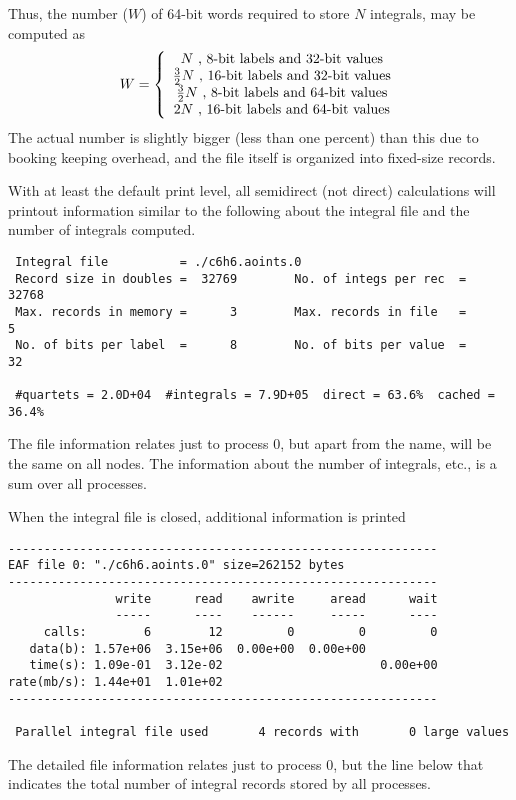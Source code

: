 Thus, the number ($W$) of 64-bit words required to store $N$ integrals,
may be computed as
\begin{displaymath}
  W = \left\{ \\
      \begin{array}{c}
        N \mbox{ , 8-bit labels and 32-bit values} \\
        \frac{3}{2}N \mbox{ , 16-bit labels and 32-bit values} \\
        \frac{3}{2}N \mbox{ , 8-bit labels and 64-bit values} \\
        2N \mbox{ , 16-bit labels and 64-bit values} 
      \end{array}
      \right.
\end{displaymath}
The actual number is slightly bigger (less than one percent) than this
due to booking keeping overhead, and the file itself is organized into
fixed-size records.

With at least the default print level, all semidirect (not direct)
calculations will printout information similar to the following about
the integral file and the number of integrals computed.
\begin{verbatim}
 Integral file          = ./c6h6.aoints.0
 Record size in doubles =  32769        No. of integs per rec  =  32768
 Max. records in memory =      3        Max. records in file   =      5
 No. of bits per label  =      8        No. of bits per value  =     32

 #quartets = 2.0D+04  #integrals = 7.9D+05  direct = 63.6%  cached = 36.4%
\end{verbatim}
The file information relates just to process 0, but apart from the
name, will be the same on all nodes.  The information about the number
of integrals, etc., is a sum over all processes.

When the integral file is closed, additional information is printed
\begin{verbatim}
------------------------------------------------------------
EAF file 0: "./c6h6.aoints.0" size=262152 bytes
------------------------------------------------------------
               write      read    awrite     aread      wait
               -----      ----    ------     -----      ----
     calls:        6        12         0         0         0
   data(b): 1.57e+06  3.15e+06  0.00e+00  0.00e+00
   time(s): 1.09e-01  3.12e-02                      0.00e+00
rate(mb/s): 1.44e+01  1.01e+02
------------------------------------------------------------

 Parallel integral file used       4 records with       0 large values
\end{verbatim}
The detailed file information relates just to process 0, but the 
line below that indicates the total number of integral records stored
by all processes.  

